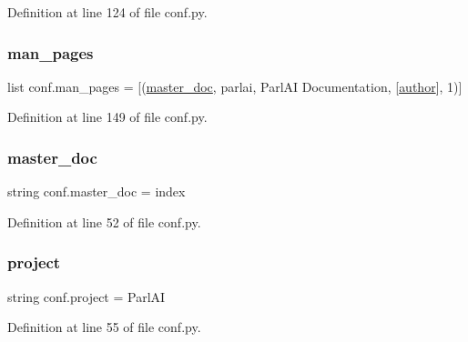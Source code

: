 Definition at line 124 of file conf.\+py.

\mbox{\label{namespaceconf_a85efc5fee48a26fa2d651f6eeb38fc2b}} 
\subsubsection{\texorpdfstring{man\+\_\+pages}{man\_pages}}
{\footnotesize\ttfamily list conf.\+man\+\_\+pages = \mbox{[}(\hyperlink{namespaceconf_a6fcd7e5236f355b1e1a55f9d95988810}{master\+\_\+doc}, \textquotesingle{}parlai\textquotesingle{}, \textquotesingle{}Parl\+AI Documentation\textquotesingle{}, \mbox{[}\hyperlink{namespaceconf_a637c239d256432248aa8d9f3ab0b8c52}{author}\mbox{]}, 1)\mbox{]}}



Definition at line 149 of file conf.\+py.

\mbox{\label{namespaceconf_a6fcd7e5236f355b1e1a55f9d95988810}} 
\subsubsection{\texorpdfstring{master\+\_\+doc}{master\_doc}}
{\footnotesize\ttfamily string conf.\+master\+\_\+doc = \textquotesingle{}index\textquotesingle{}}



Definition at line 52 of file conf.\+py.

\mbox{\label{namespaceconf_a45653c983098153b78e33600e39230eb}} 
\subsubsection{\texorpdfstring{project}{project}}
{\footnotesize\ttfamily string conf.\+project = \textquotesingle{}Parl\+AI\textquotesingle{}}



Definition at line 55 of file conf.\+py.

\mbox{\label{namespaceconf_a641130e096b26cba8a5d63ed38684de7}} 
